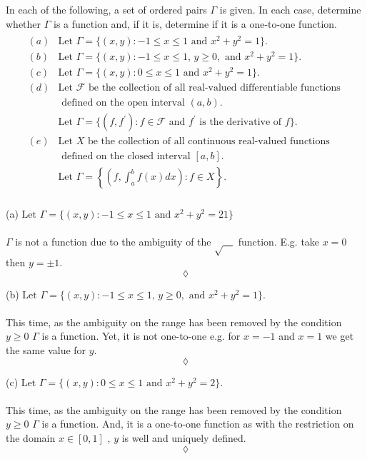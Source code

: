 \subsection{}
\begin{tcolorbox}
In each of the following, a set of ordered pairs $\Gamma$ is given. In each case, determine whether $\Gamma$ is a function and, if it is, determine if it is a one-to-one function.
\begin{align*}
\begin{array}{ll}
(a)&\text{Let } \Gamma=\{(x,y):-1\le x\le 1 \text{ and } x^2+y^2=1\}.  \\
(b)&\text{Let } \Gamma=\{(x,y):-1\le x\le 1,\, y \ge 0, \text{ and } x^2+y^2=1\}.  \\
(c)&\text{Let } \Gamma=\{(x,y):0\le x\le 1 \text{ and } x^2+y^2=1\}.  \\
(d)&\text{Let } \mathscr{F}\text{ be the collection of all real-valued differentiable functions }\\ 
&\text{ defined on the open interval } (a,b). \\
&\text{Let }\Gamma=\{(f,f^{'}):f\in\mathscr{F} \text{ and }f^{'} \text{ is the derivative of } f\}.  \\
(e)&\text{Let } X \text{ be the collection of all continuous real-valued functions }\\ 
&\text{ defined on the closed interval } [a,b]. \\
&\text{Let }\Gamma=\left\{\left ( f,\int_a^b f(x)dx\right):f\in X  \right \}.  \\
\end{array}
\end{align*} 
\end{tcolorbox}
(a) $\text{Let } \Gamma=\{(x,y):-1\le x\le 1 \text{ and } x^2+y^2=21\}$\\\\
$\Gamma$ is not a function due to the ambiguity of the $\sqrt{\quad}$ function. E.g. take $x=0$ then $y =\pm1$.
$$\lozenge$$

(b) $\text{Let } \Gamma=\{(x,y):-1\le x\le 1,\, y \ge 0, \text{ and } x^2+y^2=1\}. $ \\\\
This time, as the ambiguity on the range has been removed by the condition $y\ge0$ $\Gamma$ is a function. Yet, it is not one-to-one e.g. for $x=-1$ and $x=1$ we get the same value for $y$.
$$\lozenge$$

(c) $\text{Let } \Gamma=\{(x,y):0\le x\le 1 \text{ and } x^2+y^2=2\}. $ \\\\
This time, as the ambiguity on the range has been removed by the condition $y\ge0$ $\Gamma$ is a function. And,  it is a one-to-one function as with the restriction on the domain $x\in [0,1]$ , $y$ is well and uniquely defined.
$$\lozenge$$

